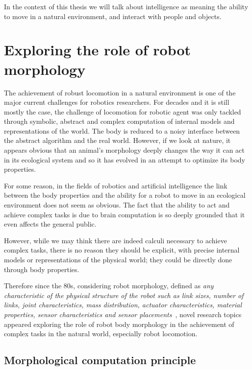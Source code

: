 In the context of this thesis we will talk about intelligence as meaning the ability to move in a natural environment, and interact with people and objects.



\section{Exploring the role of robot morphology} %

The achievement of robust locomotion in a natural environment is one of the major current challenges for robotics researchers. For decades and it is still mostly the case, the challenge of locomotion for robotic agent was only tackled through symbolic, abstract and complex computation of internal models and representations of the world. The body is reduced to a noisy interface between the abstract algorithm and the real world.
However, if we look at nature, it appears obvious that an animal’s morphology deeply changes the way it can act in its ecological system and so it has evolved in an attempt to optimize its body properties.

For some reason, in the fields of robotics and artificial intelligence the link between the body properties and the ability for a robot to move in an ecological environment does not seem as obvious. The fact that the ability to act and achieve complex tasks is due to brain computation is so deeply grounded that it even affects the general public.

However, while we may think there are indeed calculi necessary to achieve complex tasks, there is no reason they should be explicit, with precise internal models or representations of the physical world; they could be directly done through body properties.

Therefore since the 80s, considering robot morphology, defined as \emph{any characteristic of the physical structure of the robot such as link sizes, number of links, joint characteristics, mass distribution, actuator characteristics, material properties, sensor characteristics and sensor placements}~\parencite{paul2006morphological}, novel research topics appeared exploring the role of robot body morphology in the achievement of complex tasks in the natural world, especially robot locomotion.


\subsection{Morphological computation principle} %


